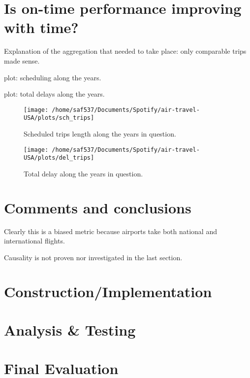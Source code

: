 \documentclass[a4paper, 11pt]{article}
\begin{document}
\section*{Is on-time performance improving with time?}

Explanation of the aggregation that needed to take place: only comparable trips made sense.

plot: scheduling along the years.

plot: total delays along the years.


\begin{figure}[!ht]
  \caption{Scheduled trips length along the years in question.}
  \label{m_days}
  \centering
    \texttt{[image: /home/saf537/Documents/Spotify/air-travel-USA/plots/sch\_trips]}
\end{figure}


\begin{figure}[!ht]
  \caption{Total delay along the years in question.}
  \label{m_days}
  \centering
    \texttt{[image: /home/saf537/Documents/Spotify/air-travel-USA/plots/del\_trips]}
\end{figure}

\section*{Comments and conclusions}

Clearly this is a biased metric because airports take both national and international flights.

Causality is not proven nor investigated in the last section.


\section*{Construction/Implementation}

\section*{Analysis \& Testing}


\section*{Final Evaluation}
\end{document}
